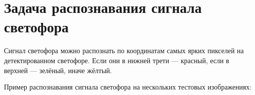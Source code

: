 \section{Задача распознавания сигнала светофора}

Сигнал светофора можно распознать по координатам самых ярких пикселей на детектированном светофоре. Если они в нижней трети — красный, если в верхней — зелёный, иначе жёлтый.

Пример распознавания сигнала светофора на нескольких тестовых изображениях:

